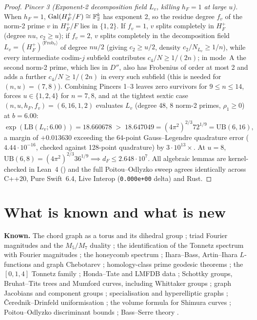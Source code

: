 \documentclass[11pt]{amsart}
\numberwithin{equation}{section}
\theoremstyle{plain}
\theoremstyle{definition}\newtheorem{definition}[theorem]{Definition}
\theoremstyle{remark}\newtheorem{remark}[theorem]{Remark}
\begin{document}
\begin{proof}
\emph{Pincer 3 (Exponent-2 decomposition field $L_v$, killing $h_F=1$ at large $u$).} When $h_F=1$, $\operatorname{Gal}(H_F^+/F)\cong\mathbb{F}_2^k$ has exponent 2, so the residue degree $f_v$ of the norm-2 prime $v$ in $H_F^+/F$ lies in $\{1,2\}$. If $f_v=1$, $v$ splits completely in $H_F^+$ (degree $nu$, $c_2\ge u$); if $f_v=2$, $v$ splits completely in the decomposition field $L_v=(H_F^+)^{\langle\mathrm{Frob}_v\rangle}$ of degree $nu/2$ (giving $c_2\ge u/2$, density $c_2/N_{L_v}\ge1/n$), while every intermediate codim-$j$ subfield contributes $c_4/N\ge1/(2n)$; in mode~A the second norm-2 prime, which lies in $D''$, also has Frobenius of order at most 2 and adds a further $c_4/N\ge1/(2n)$ in every such subfield (this is needed for $(n,u)=(7,8)$). Combining Pincers 1--3 leaves zero survivors for $9\le n\le14$, forces $u\in\{1,2,4\}$ for $n=7,8$, and at the tightest sextic case $(n,u,h_F,f_v)=(6,16,1,2)$ evaluates $L_v$ (degree 48, 8 norm-2 primes, $\rho_1\ge0$) at $b=6.00$:
\[\exp(\mathrm{LB}(L_v;6.00))=18.660678\;>\;18.647049=(4\pi^2)^{2/3}72^{1/9}=\mathrm{UB}(6,16),\]
a margin of $+0.013630$ exceeding the 64-point Gauss--Legendre quadrature error ($4.44\cdot10^{-16}$, checked against 128-point quadrature) by $3\cdot10^{13}\times$. At $u=8$, $\mathrm{UB}(6,8)=(4\pi^2)^{2/3}36^{1/9}\implies d_F\le2.648\cdot10^7$. All algebraic lemmas are kernel-checked in Lean~4 () and the full Poitou--Odlyzko sweep agrees identically across C++20, Pure Swift~6.4, Live Interop (\texttt{0.000e+00} delta) and Rust.
\end{proof}

\section{What is known and what is new}\label{sec:known}
\textbf{Known.} The chord graph as a torus and its dihedral group \cite{ds98,cohn97,cfs09}; triad Fourier magnitudes and the $M_5/M_7$ duality \cite{lewin,amiot}; the identification of the Tonnetz spectrum with Fourier magnitudes \cite{marin}; the honeycomb spectrum \cite{wallace}; Ihara--Bass, Artin--Ihara $L$-functions and graph Chebotarev \cite{ihara66,sunada86,hashimoto89,bass92,st96}; homology-class prime geodesic theorems \cite{ps87,ks90,lalley89,ps01,liu04,luoroy}; the $[0,1,4]$ Tonnetz family \cite{cohn97,catanzaro}; Honda--Tate and LMFDB data \cite{tate66,honda68,lmfdb}; Schottky groups, Bruhat--Tits trees and Mumford curves, including Whittaker groups \cite{ihara66,serre80,mumford72,gvdp80}; graph Jacobians and component groups \cite{kirchhoff1847,raynaud70,bn07}; specialisation and hyperelliptic graphs \cite{baker08,chan13}; \v{C}erednik--Drinfeld uniformisation \cite{cerednik76,drinfeld76,ribet90}; the volume formula for Shimura curves \cite{voight21}; Poitou--Odlyzko discriminant bounds \cite{poitou77,odlyzko76,odlyzko90}; Bass--Serre theory \cite{serre80}.
\end{document}
